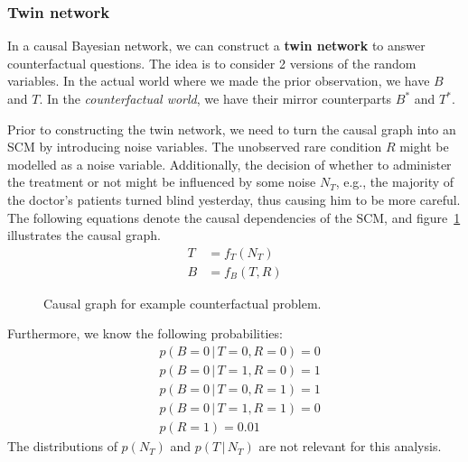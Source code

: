 \documentclass{article}
\newcommand{\giv}{\,|\,}
\begin{document}
\subsubsection{Twin network}

In a causal Bayesian network, we can construct a \textbf{twin network} to answer counterfactual questions. The idea is to consider 2 versions of the random variables. In the actual world where we made the prior observation, we have $B$ and $T$. In the \textit{counterfactual world}, we have their mirror counterparts $B^*$ and $T^*$. 

Prior to constructing the twin network, we need to turn the causal graph into an SCM by introducing noise variables. The unobserved rare condition $R$ might be modelled as a noise variable. Additionally, the decision of whether to administer the treatment or not might be influenced by some noise $N_T$, e.g., the majority of the doctor's patients turned blind yesterday, thus causing him to be more careful. The following equations denote the causal dependencies of the SCM, and figure~\ref{fig:cfex} illustrates the causal graph.
\begin{align*}
    T &= f_T(N_T)\\
    B &= f_B(T, R)
\end{align*}

\begin{figure}[H]
    \centering
    
    \caption{Causal graph for example counterfactual problem.}
    \label{fig:cfex}
\end{figure}

\noindent Furthermore, we know the following probabilities:
\begin{align*}
    &p(B=0 \giv T=0, R=0) = 0\\
    &p(B=0 \giv T=1, R=0) = 1\\
    &p(B=0 \giv T=0, R=1) = 1\\
    &p(B=0 \giv T=1, R=1) = 0\\
    &p(R=1) = 0.01
\end{align*}
\noindent The distributions of $p(N_T)$ and $p(T \giv N_T)$ are not relevant for this analysis. 
\end{document}
